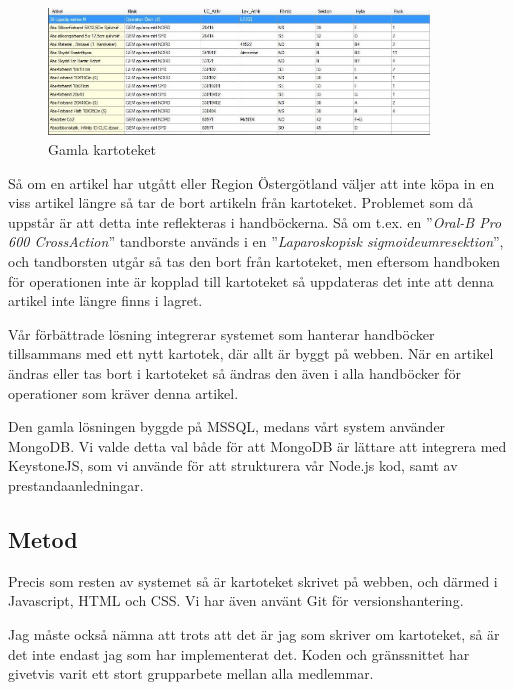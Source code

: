 \begin{figure}[h!]
  \includegraphics[width=0.9\textwidth]{../images/forradsinfo.jpg}
  \caption{Gamla kartoteket}
  \label{fig:kartotek}
\end{figure}

Så om en artikel har utgått eller Region Östergötland
väljer att inte köpa in en viss artikel längre så tar de bort artikeln
från kartoteket. Problemet som då uppstår är att detta inte reflekteras
i handböckerna. Så om t.ex. en ''\textit{Oral-B Pro 600 CrossAction}'' tandborste används i
en ''\textit{Laparoskopisk sigmoideumresektion}'', och tandborsten utgår
så tas den bort från kartoteket, men eftersom handboken för operationen inte är
kopplad till kartoteket så uppdateras det inte att denna artikel inte längre finns i lagret.

Vår förbättrade lösning
integrerar systemet som hanterar handböcker tillsammans med ett nytt kartotek,
där allt är byggt på webben. När en artikel ändras eller tas bort i kartoteket
så ändras den även i alla handböcker för operationer som kräver denna artikel.

Den gamla lösningen byggde på MSSQL, medans vårt system använder
MongoDB. Vi valde detta val både för att MongoDB är lättare att
integrera med KeystoneJS, som vi använde för att strukturera vår
Node.js kod, samt av prestandaanledningar\cite{mongoPerf}.


\subsection{Metod}
Precis som resten av systemet så är kartoteket skrivet på webben, och
därmed i Javascript, HTML och CSS.
Vi har även använt Git för versionshantering.

Jag måste också nämna att trots att det är jag som skriver om kartoteket,
så är det inte endast jag som har implementerat det. Koden och gränssnittet har givetvis
varit ett stort grupparbete mellan alla medlemmar.


